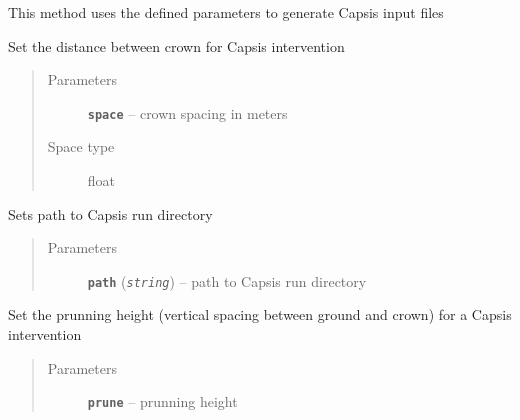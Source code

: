 \documentclass[letterpaper,10pt,english]{sphinxmanual}
\begin{document}
\begin{fulllineitems}
\begin{fulllineitems}
\label{capsis_RunConfig:capsis.RunConfig.save_config}
This method uses the defined parameters to generate Capsis input files

\end{fulllineitems}


\begin{fulllineitems}
\label{capsis_RunConfig:capsis.RunConfig.set_crown_space}
Set the distance between crown for Capsis intervention
\begin{quote}\begin{description}
\item[{Parameters}] \leavevmode
\textbf{\texttt{space}} -- crown spacing in meters

\item[{Space type}] \leavevmode
float

\end{description}\end{quote}

\end{fulllineitems}


\begin{fulllineitems}
\label{capsis_RunConfig:capsis.RunConfig.set_path}
Sets path to Capsis run directory
\begin{quote}\begin{description}
\item[{Parameters}] \leavevmode
\textbf{\texttt{path}} (\emph{\texttt{string}}) -- path to Capsis run directory

\end{description}\end{quote}

\end{fulllineitems}


\begin{fulllineitems}
\label{capsis_RunConfig:capsis.RunConfig.set_prune_height}
Set the prunning height (vertical spacing between ground and crown)
for a Capsis intervention
\begin{quote}\begin{description}
\item[{Parameters}] \leavevmode
\textbf{\texttt{prune}} -- prunning height


\end{description}
\end{quote}
\end{fulllineitems}
\end{fulllineitems}
\end{document}
